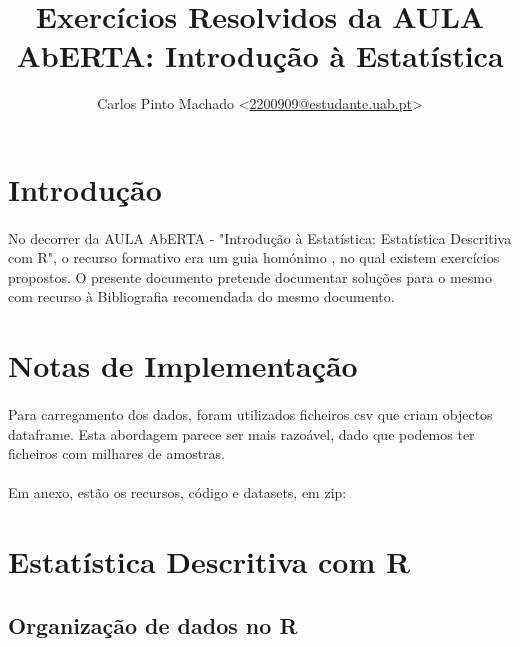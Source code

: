 \documentclass[11pt,a4paper]{article}
\author{Carlos Pinto Machado
	<\href{mailto:2200909@estudante.uab.pt}{2200909@estudante.uab.pt}>}
\title{Exercícios Resolvidos da AULA AbERTA: Introdução à Estatística}
\begin{document}
\maketitle
\tableofcontents

\clearpage

\section*{Introdução}

\paragraph{} No decorrer da AULA AbERTA - "Introdução à Estatística:
Estatística Descritiva com R"\cite{AulaAbertaIntroducaoEstatistica2017}, o
recurso formativo era um guia homónimo
\cite{OliveiraAulaAberta2017}, no qual existem
exercícios propostos. O presente documento pretende documentar soluções para o
mesmo com recurso à Bibliografia recomendada do mesmo
documento\cite{OliveiraEstatisticaDescritiva2011}.

\section*{Notas de Implementação}

\paragraph{} Para carregamento dos dados, foram utilizados ficheiros csv que
criam objectos dataframe. Esta abordagem parece ser mais razoável, dado que
podemos ter ficheiros com milhares de amostras.

\paragraph{} Em anexo, estão os recursos, código e datasets, em zip:


\clearpage

\setcounter{section}{2}
\section{Estatística Descritiva com R}
\subsection{Organização de dados no R}
\end{document}
